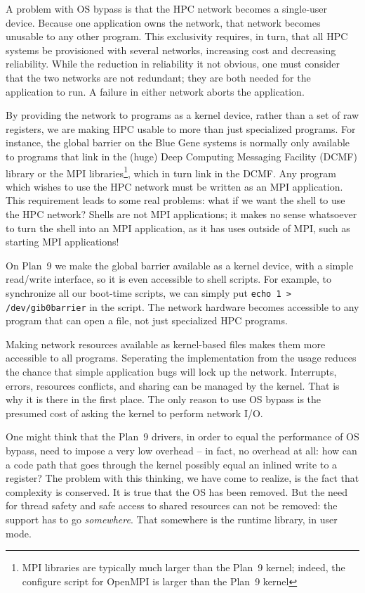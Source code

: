 \documentclass[letterpaper]{article}
\begin{document}
A problem with OS bypass is that the HPC network becomes a single-user device. Because one application 
owns the network, that network becomes unusable to any other program. This exclusivity requires, in turn, that all
HPC systems be provisioned with several networks, increasing cost and decreasing reliability. While the reduction in reliability it not obvious, one must consider 
that the two networks are not redundant; they are both needed for the application
to run. A failure in either network aborts the application. 

By providing the network to programs as a kernel device, rather than a set of raw registers, we are making HPC usable 
to more than just specialized programs. For instance, the global barrier on the Blue Gene systems is normally only 
available to programs that link in the (huge) Deep Computing Messaging Facility (DCMF) library or the 
MPI libraries\footnote{MPI libraries are typically much larger than the Plan~9 kernel; indeed, the configure script for OpenMPI is larger than the Plan~9 kernel}, which in turn 
link in the DCMF. Any program which wishes to use the HPC network must be written as an MPI 
application. This requirement leads to some real problems: what if we want the shell to use the HPC network? 
Shells are not MPI applications; it makes
no sense whatsoever to turn the shell into an MPI application, as it has uses outside of MPI, such 
as starting MPI applications! 

On Plan~9 we make the global barrier available as a kernel device, with a simple read/write interface, so it is 
even accessible to shell scripts. For example, to synchronize all our boot-time scripts, we can simply put 
{\tt echo 1 > /dev/gib0barrier} in the script.
The network hardware becomes accessible to any program that can open a file, not just specialized HPC programs. 

Making network resources available as kernel-based files
makes them more accessible to all programs. Seperating the 
implementation from the usage reduces the chance that simple application bugs will lock up the network. 
Interrupts, errors, resources conflicts, and sharing can be managed by the kernel. That is why it 
is there in the first place. The only reason to use OS bypass is the presumed cost of asking the kernel to 
perform network I/O. 

One might think that the Plan~9 drivers, in order to equal the performance of OS bypass, need to impose a very 
low overhead -- in fact, no overhead at all: how can a code path that goes through the kernel possibly equal an
inlined write to a register? The problem with this thinking, we have come to realize, is the fact that complexity is conserved. It is true that the OS has been removed. But the need for thread safety and safe access to shared resources can not be removed: the support  has to go {\em somewhere}. That somewhere is the runtime library, in user mode. 
\end{document}
